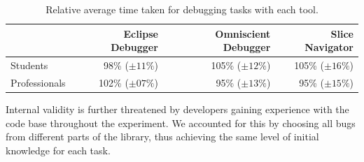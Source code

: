 \begin{table}%
	\begin{tabulary}{\textwidth}{LRRR}
		& Eclipse Debugger & Omniscient Debugger & Slice Navigator \\ \midrule
Students & 98\% ($\pm11\%$) & 105\% ($\pm12\%$) & 105\% ($\pm16\%$) \\
Professionals & 102\% ($\pm07\%$) & 95\% ($\pm13\%$) & 95\% ($\pm15\%$) \\
	\end{tabulary}
	\caption{Relative average time taken for debugging tasks with each tool.}
	\label{tab:groupresult}
\end{table}

Internal validity is further threatened by developers gaining experience with the code base throughout the experiment.
We accounted for this by choosing all bugs from different parts of the library, thus achieving the same level of initial knowledge for each task.


\tmpEnd